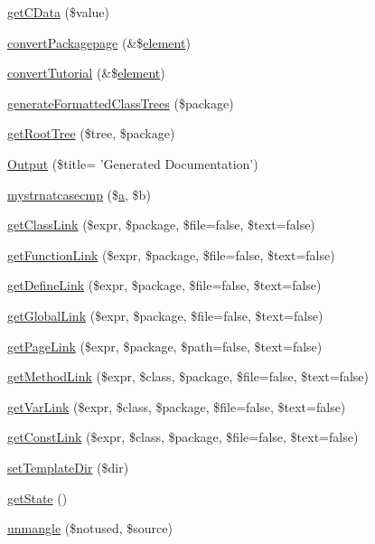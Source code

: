 \begin{DoxyCompactItemize}
\item 
\hyperlink{class_p_d_fdefault_converter_a37fe6f6ddd1cd15d360788064dce7a43}{get\-C\-Data} (\$value)
\item 
\hyperlink{class_p_d_fdefault_converter_ab5f3dde79110c1809860e42205e9b787}{convert\-Packagepage} (\&\$\hyperlink{bug-904820_8php_aa94081298ab2dfd0f261cce6c203d9aa}{element})
\item 
\hyperlink{class_p_d_fdefault_converter_a129673c76d85dfee7bd2170d59b33fba}{convert\-Tutorial} (\&\$\hyperlink{bug-904820_8php_aa94081298ab2dfd0f261cce6c203d9aa}{element})
\item 
\hyperlink{class_p_d_fdefault_converter_ac4ce6d55dd5c5683966b882dcc6809e0}{generate\-Formatted\-Class\-Trees} (\$package)
\item 
\hyperlink{class_p_d_fdefault_converter_afbb2d3f59f731227c79f10ca318c2e88}{get\-Root\-Tree} (\$tree, \$package)
\item 
\hyperlink{class_p_d_fdefault_converter_a80f6160658ac3dff71a86350bb7eb148}{\-Output} (\$title= '\-Generated \-Documentation')
\item 
\hyperlink{class_p_d_fdefault_converter_a6cd6192676bd527140a1053e471267a1}{mystrnatcasecmp} (\$\hyperlink{classa}{a}, \$b)
\item 
\hyperlink{class_p_d_fdefault_converter_a800228e73b38402c365fec0ab9961c1d}{get\-Class\-Link} (\$expr, \$package, \$file=false, \$text=false)
\item 
\hyperlink{class_p_d_fdefault_converter_ab5f43d9a50aae936411c84a680e9c186}{get\-Function\-Link} (\$expr, \$package, \$file=false, \$text=false)
\item 
\hyperlink{class_p_d_fdefault_converter_a17086c17d82323b3e929d24ad6da092d}{get\-Define\-Link} (\$expr, \$package, \$file=false, \$text=false)
\item 
\hyperlink{class_p_d_fdefault_converter_afef6bfb2b26aac19e52a1d153d4bae4b}{get\-Global\-Link} (\$expr, \$package, \$file=false, \$text=false)
\item 
\hyperlink{class_p_d_fdefault_converter_aad8f419498310968275cbd3658e75c90}{get\-Page\-Link} (\$expr, \$package, \$path=false, \$text=false)
\item 
\hyperlink{class_p_d_fdefault_converter_a23ab6aa7d92e8ca1cb398a8201d0bd61}{get\-Method\-Link} (\$expr, \$class, \$package, \$file=false, \$text=false)
\item 
\hyperlink{class_p_d_fdefault_converter_a5a0a06a811d1135f4a05c79fb74909db}{get\-Var\-Link} (\$expr, \$class, \$package, \$file=false, \$text=false)
\item 
\hyperlink{class_p_d_fdefault_converter_ad028169d32b0a0293c8bf2fbbff60594}{get\-Const\-Link} (\$expr, \$class, \$package, \$file=false, \$text=false)
\item 
\hyperlink{class_p_d_fdefault_converter_a3b18827bcab9cfc5d259cba6fa5ec535}{set\-Template\-Dir} (\$dir)
\item 
\hyperlink{class_p_d_fdefault_converter_afbf787ced76807989fb3093e1772c5a1}{get\-State} ()
\item 
\hyperlink{class_p_d_fdefault_converter_accb32ecf6023f5b5fbdb74416f1ad19f}{unmangle} (\$notused, \$source)
\end{DoxyCompactItemize}
